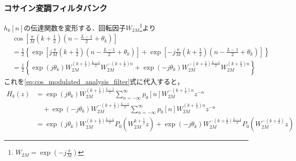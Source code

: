 \documentclass[14pt,xcolor=dvipsnames,table,dvipdfmx]{beamer}
\begin{document}
\begin{frame}[c]
    \frametitle{コサイン変調フィルタバンク}
    $h_{k}[n]$の伝達関数を変形する．回転因子$W_{2M}$\footnote{$W_{2M} = \exp\left(-j\frac{\pi}{M}\right)$}より
    \scriptsize
    \begin{align*}
        &\cos\left[ \frac{\pi}{M} \left( k + \frac{1}{2} \right) \left( n - \frac{L - 1}{2} + \theta_{k} \right) \right] \\
        &= \frac{1}{2} \left\{ \exp\left[ j \frac{\pi}{M} \left( k + \frac{1}{2} \right) \left( n - \frac{L - 1}{2} + \theta_{k} \right) \right] + \exp\left[-j \frac{\pi}{M} \left( k + \frac{1}{2} \right) \left( n - \frac{L - 1}{2} + \theta_{k} \right) \right] \right\} \\
        &= \frac{1}{2} \left\{ \exp(j\theta_{k}) W_{2M}^{\left( k + \frac{1}{2} \right)\frac{L-1}{2}}W_{2M}^{-\left( k + \frac{1}{2} \right)n} + \exp(-j\theta_{k}) W_{2M}^{-\left( k + \frac{1}{2} \right)\frac{L-1}{2}} W_{2M}^{\left( k + \frac{1}{2} \right)n} \right\}
    \end{align*}
    \normalsize
    これを\eqref{eq:cos_modulated_analysis_filter}式に代入すると，
    \scriptsize
    \begin{align*}
        H_{k}(z) &= \exp(j\theta_{k}) W_{2M}^{\left( k + \frac{1}{2} \right)\frac{L-1}{2}} \sum_{n = -\infty}^{\infty} p_{0}[n] W_{2M}^{-\left(k + \frac{1}{2} \right)n} z^{-n} \\
        &\quad + \exp(-j\theta_{k}) W_{2M}^{-\left( k + \frac{1}{2} \right)\frac{L-1}{2}} \sum_{n = -\infty}^{\infty} p_{0}[n] W_{2M}^{\left(k + \frac{1}{2} \right)n} z^{-n} \\
        &= \exp(j\theta_{k}) W_{2M}^{\left( k + \frac{1}{2} \right)\frac{L-1}{2}} P_{0}\left(W_{2M}^{k + \frac{1}{2}} z \right) + \exp(-j\theta_{k}) W_{2M}^{-\left( k + \frac{1}{2} \right)\frac{L-1}{2}} P_{0}\left(W_{2M}^{-\left(k + \frac{1}{2}\right)} z \right)
    \end{align*}
\end{frame}
\end{document}
